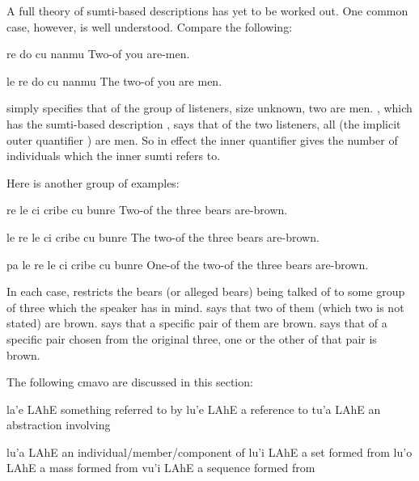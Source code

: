 A full theory of sumti-based descriptions has yet to be
    worked out. One common case, however, is well understood.
    Compare the following:
\begin{example}
re do cu nanmu\n
Two-of you are-men.
\end{example}

\begin{example}
le re do cu nanmu\n
The two-of you are men.
\end{example}

 simply specifies that of the
    group of listeners, size unknown, two are men. , which has the sumti-based
    description , says that of the two listeners, all
    (the implicit outer quantifier ) are men. So in effect
    the inner quantifier  gives the number of individuals
    which the inner sumti  refers to. 

Here is another group of examples:
\begin{example}
re le ci cribe cu bunre\n
Two-of the three bears are-brown.
\end{example}

\begin{example}
le re le ci cribe cu bunre\n
The two-of the three bears are-brown.
\end{example}

\begin{example}
pa le re le ci cribe cu bunre\n
One-of the two-of the three bears are-brown.
\end{example}

In each case,  restricts the bears (or alleged
    bears) being talked of to some group of three which the speaker
    has in mind.  says that two of
    them (which two is not stated) are brown.  says that a specific pair of them
    are brown.  says that of a
    specific pair chosen from the original three, one or the other
    of that pair is brown.



The following cmavo are discussed in this section:

   la'e    LAhE    something referred to by
    lu'e    LAhE    a reference to
    tu'a    LAhE    an abstraction involving

lu'a    LAhE    an individual/member/component of
    lu'i    LAhE    a set formed from
    lu'o    LAhE    a mass formed from
    vu'i    LAhE    a sequence formed from


